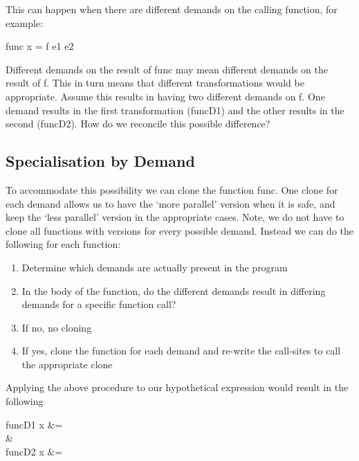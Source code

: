 This can happen when there are different demands on the calling function, for
example:

\begin{haskell}
        func x = f e1 e2
\end{haskell}

Different demands on the result of \<func\> may mean different demands on
the result of \<f\>. This in turn means that different transformations would
be appropriate. Assume this results in having two different demands on
\<f\>. One demand results in the first transformation (\<funcD1\>) and
the other results in the second (\<funcD2\>). How do we reconcile this
possible difference?

\subsection*{Specialisation by Demand}

To accommodate this possibility we can clone the function \<func\>. One
clone for each demand allows us to have the `more parallel' version when it
is safe, and keep the `less parallel' version in the appropriate cases. Note,
we do not have to clone all functions with versions for every possible demand.
Instead we can do the following for each function:

\begin{enumerate}
    \item Determine which demands are actually present in the program
    \item In the body of the function, do the different demands result in differing
        demands for a specific function call?
    \item If no, no cloning
    \item If yes, clone the function for each demand and re-write the call-sites to call
        the appropriate clone
\end{enumerate}

Applying the above procedure to our hypothetical expression would result in the
following


\begin{haskell}
funcD1 x &=  \\
\quad&\quad\\
funcD2 x &= 
\end{haskell}
